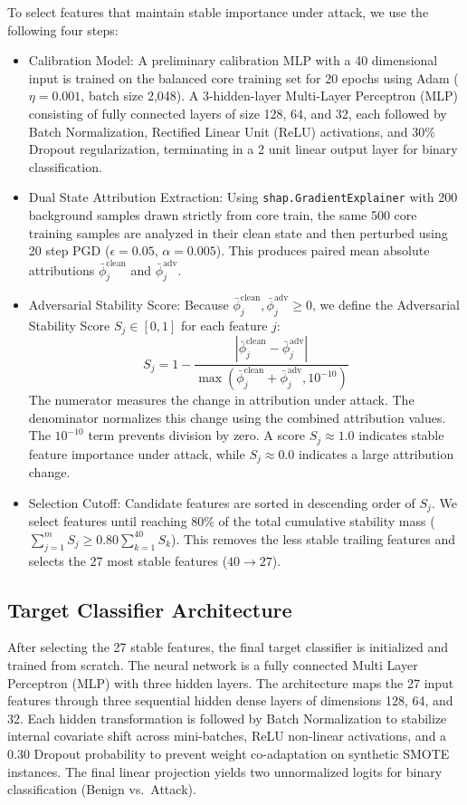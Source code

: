 \documentclass[conference]{IEEEtran}
\begin{document}
To select features that maintain stable importance under attack, we use the following four steps:
\begin{itemize}
    \item Calibration Model: A preliminary calibration MLP with a 40 dimensional input is trained on the balanced core training set for 20 epochs using Adam ($\eta=0.001$, batch size 2,048). A 3-hidden-layer Multi-Layer Perceptron (MLP) consisting of fully connected layers of size 128, 64, and 32, each followed by Batch Normalization, Rectified Linear Unit (ReLU) activations, and 30\% Dropout regularization, terminating in a 2 unit linear output layer for binary classification.
    \item Dual State Attribution Extraction: Using \texttt{shap.GradientExplainer} with 200 background samples drawn strictly from core train, the same 500 core training samples are analyzed in their clean state and then perturbed using 20 step PGD ($\epsilon=0.05$, $\alpha=0.005$). This produces paired mean absolute attributions $\bar{\phi}_j^{\text{clean}}$ and $\bar{\phi}_j^{\text{adv}}$.
    \item Adversarial Stability Score: Because $\bar{\phi}_j^{\text{clean}},\bar{\phi}_j^{\text{adv}}\ge0$, we define the Adversarial Stability Score $S_j\in[0,1]$ for each feature $j$:
    \begin{equation}
    S_j = 1 - \frac{\left|\bar{\phi}_j^{\text{clean}} - \bar{\phi}_j^{\text{adv}}\right|}{\max\left(\bar{\phi}_j^{\text{clean}} + \bar{\phi}_j^{\text{adv}}, 10^{-10}\right)}
    \end{equation}
    The numerator measures the change in attribution under attack. The denominator normalizes this change using the combined attribution values. The $10^{-10}$ term prevents division by zero. A score $S_j\approx1.0$ indicates stable feature importance under attack, while $S_j\approx0.0$ indicates a large attribution change.
    \item Selection Cutoff: Candidate features are sorted in descending order of $S_j$. We select features until reaching 80\% of the total cumulative stability mass ($\sum_{j=1}^{m} S_j \ge 0.80 \sum_{k=1}^{40} S_k$). This removes the less stable trailing features and selects the 27 most stable features ($40\to27$).
\end{itemize}

\subsection{Target Classifier Architecture}
After selecting the 27 stable features, the final target classifier is initialized and trained from scratch. The neural network is a fully connected Multi Layer Perceptron (MLP) with three hidden layers. The architecture maps the 27 input features through three sequential hidden dense layers of dimensions 128, 64, and 32. Each hidden transformation is followed by Batch Normalization to stabilize internal covariate shift across mini-batches, ReLU non-linear activations, and a 0.30 Dropout probability to prevent weight co-adaptation on synthetic SMOTE instances. The final linear projection yields two unnormalized logits for binary classification (Benign vs.\ Attack).
\end{document}
